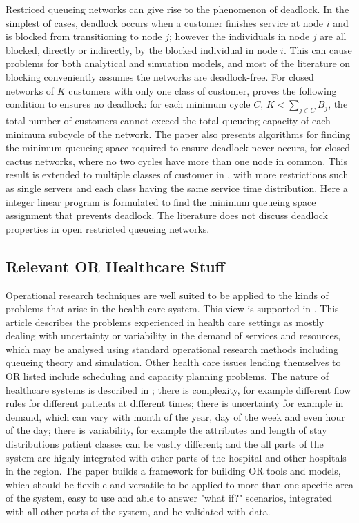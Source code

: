 \documentclass{article}
\begin{document}
Restriced queueing networks can give rise to the phenomenon of deadlock.
In the simplest of cases, deadlock occurs when a customer finishes service at node $i$ and is blocked from transitioning to node $j$; however the individuals in node $j$ are all blocked, directly or indirectly, by the blocked individual in node $i$.
This can cause problems for both analytical and simuation models, and most of the literature on blocking conveniently assumes the networks are deadlock-free.
For closed networks of $K$ customers with only one class of customer, \cite{kunduakyildiz89} proves the following condition to ensures no deadlock: for each minimum cycle $C$, $K < \sum_{j\in C} B_j$, the total number of customers cannot exceed the total queueing capacity of each minimum subcycle of the network.
The paper also presents algorithms for finding the minimum queueing space required to ensure deadlock never occurs, for closed cactus networks, where no two cycles have more than one node in common.
This result is extended to multiple classes of customer in \cite{liebeherrakyildiz95}, with more restrictions such as single servers and each class having the same service time distribution.
Here a integer linear program is formulated to find the minimum queueing space assignment that prevents deadlock.
The literature does not discuss deadlock properties in open restricted queueing networks.

\subsection{Relevant OR Healthcare Stuff}
Operational research techniques are well suited to be applied to the kinds of problems that arise in the health care system.
This view is supported in \cite{buhaug02}.
This article describes the problems experienced in health care settings as mostly dealing with uncertainty or variability in the demand of services and resources, which may be analysed using standard operational research methods including queueing theory and simulation.
Other health care issues lending themselves to OR listed include scheduling and capacity planning problems.
The nature of healthcare systems is described in \cite{harper02}; there is complexity, for example different flow rules for different patients at different times; there is uncertainty for example in demand, which can vary with month of the year, day of the week and even hour of the day; there is variability, for example the attributes and length of stay distributions patient classes can be vastly different; and the all parts of the system are highly integrated with other parts of the hospital and other hospitals in the region.
The paper builds a framework for building OR tools and models, which should be flexible and versatile to be applied to more than one specific area of the system, easy to use and able to answer "what if?" scenarios, integrated with all other parts of the system, and be validated with data.
\end{document}
